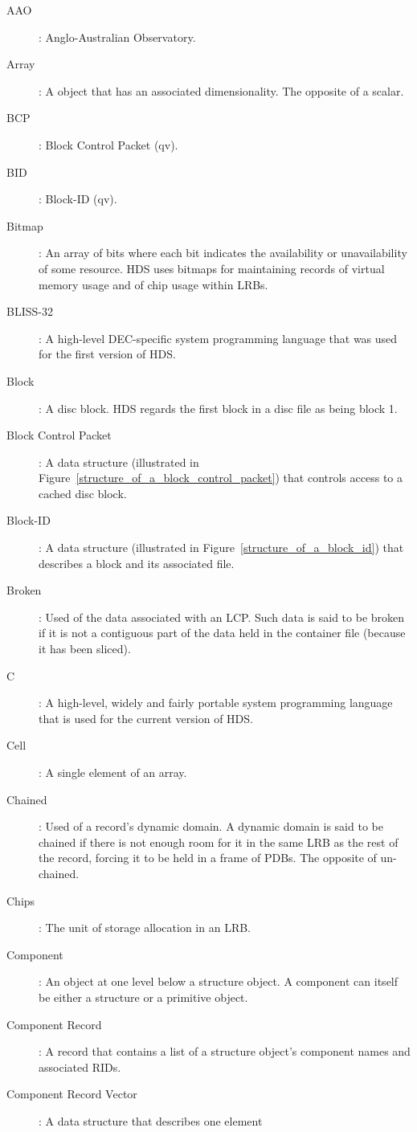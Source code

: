\begin {description}
\item [AAO]: Anglo-Australian Observatory.
\item [Array]: A object that has an associated dimensionality. The opposite
of a scalar.
\item [BCP]: Block Control Packet (qv).
\item [BID]: Block-ID (qv).
\item [Bitmap]: An array of bits where each bit indicates the availability or
unavailability of some resource. HDS uses bitmaps for maintaining records
of virtual memory usage and of chip usage within LRBs.
\item [BLISS-32]: A high-level DEC-specific system programming language that
was used for the first version of HDS.
\item [Block]: A disc block. HDS regards the first block in a disc file as
being block 1.
\item [Block Control Packet]: A data structure (illustrated in
Figure~\ref{structure_of_a_block_control_packet}) that controls access to a
cached disc block.
\item [Block-ID]: A data structure (illustrated in
Figure~\ref{structure_of_a_block_id}) that describes a block and its associated
file.
\item [Broken]: Used of the data associated with an LCP. Such data is said
to be broken if it is not a contiguous part of the data held in the container
file (because it has been sliced).
\item [C]: A high-level, widely and fairly portable system programming language
that is used for the current version of HDS.
\item [Cell]: A single element of an array.
\item [Chained]: Used of a record's dynamic domain. A dynamic domain is said
to be chained if there is not enough room for it in the same LRB as the
rest of the record, forcing it to be held in a frame of PDBs. The opposite
of un-chained.
\item [Chips]: The unit of storage allocation in an LRB.
\item [Component]: An object at one level below a structure object. A component
can itself be either a structure or a primitive object.
\item [Component Record]: A record that contains a list of a structure object's
component names and associated RIDs.
\item [Component Record Vector]: A data structure that describes one element

\end{description}
